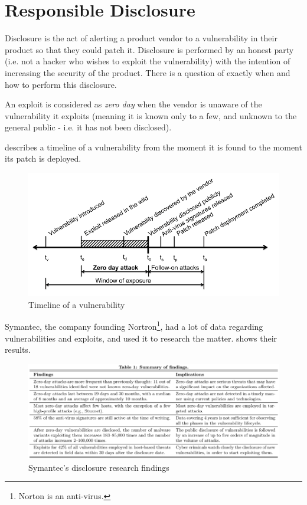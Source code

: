 \section{Responsible Disclosure}
Disclosure is the act of alerting a product vendor to a vulnerability in their
product so that they could patch it. Disclosure is performed by an honest party
(i.e. not a hacker who wishes to exploit the vulnerability) with the intention
of increasing the security of the product. There is a question of exactly when
and how to perform this disclosure.

An exploit is considered as \textit{zero day} when the vendor is unaware of the
vulnerability it exploits (meaning it is known only to a few, and unknown to the
general public - i.e. it has not been disclosed).

 describes a timeline of a vulnerability from the moment
it is found to the moment its patch is deployed.

\begin{figure}[!ht]
    \centering
    \includegraphics[width=\textwidth]{images/Vulnerability_Timeline.PNG}
    \caption{Timeline of a vulnerability} \label{fig:vulnerability_timeline}
\end{figure}

Symantec, the company founding Nortron\footnote{Norton is an anti-virus.}, had a
lot of data regarding vulnerabilities and exploits, and used it to research the
matter.  shows their results.

\begin{figure}[!ht]
    \centering
    \includegraphics[width=\textwidth]{images/Disclosure_Research_Findings.PNG}
    \caption{Symantec's disclosure research findings} \label{fig:disclosure_research_findings}
\end{figure}

